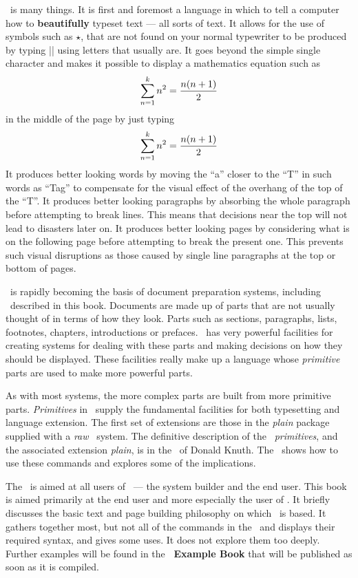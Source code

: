 \tex\ is many things. It is first and foremost a language in which to tell a
computer how to {\bf beautifully} typeset text --- all sorts of text. It allows for the use of
symbols such as $\star$, that are not found on your normal typewriter to be
produced by typing |\star| using letters that usually are. It goes beyond the
simple single character and makes it possible to display a mathematics
equation such as 
$$
\sum_{n=1}^k n^2 = {n(n+1)\over 2}
$$
in the middle of the page by just typing
\begintt
$$
\sum_{n=1}^k n^2 = {n(n+1)\over 2}
$$
\endtt
It produces better looking words by moving the ``a'' closer to the ``T'' in
such words as ``Tag'' to compensate for the visual effect of the overhang of
the top of the ``T''. It produces better looking paragraphs by absorbing the
whole paragraph before attempting to break lines. This means that decisions
near the top will not lead to disasters later on. It produces better looking
pages by considering what is on the following page before attempting to break
the present one. This prevents such visual disruptions as those 
caused by single line paragraphs at the top or bottom of pages. 

\tex\ is rapidly becoming the basis of document preparation systems,
including \intex\  described in this book.
Documents are made up of parts that are not usually
thought of in terms of how they look. Parts such as sections, paragraphs,
lists, footnotes, chapters, introductions or prefaces. \tex\ has very
powerful facilities for creating systems for dealing with these parts and
making decisions on how they should be displayed. These facilities really
make up a language whose {\it primitive} parts are used to make more powerful
parts. 


As with most systems, the
more complex parts are built from more primitive parts. {\it Primitives} in
\tex\ supply the fundamental facilities for both typesetting and language
extension. The first set of extensions are those in the {\it plain} package
supplied with a {\it raw} \tex\ system. The definitive description of 
the \tex\ {\it primitives}, and the associated extension {\it plain}, is in
the \texbook\ of Donald Knuth. The \texbook\ shows how to use these commands
and explores some of the implications. 

The \texbook\ is aimed at all users of
\tex\ --- the system builder and the end user. This book is aimed primarily
at the end user and more especially the user of \intex. 
It briefly discusses the basic text and page building
philosophy on which \tex\ is based. 
It gathers together most, but not all of the commands in the
\texbook\ and displays their required syntax, and gives some uses. It does
not explore them too deeply. Further examples will be found in the 
{\bf \tex\ Example Book} that will be published as soon as it is compiled.

